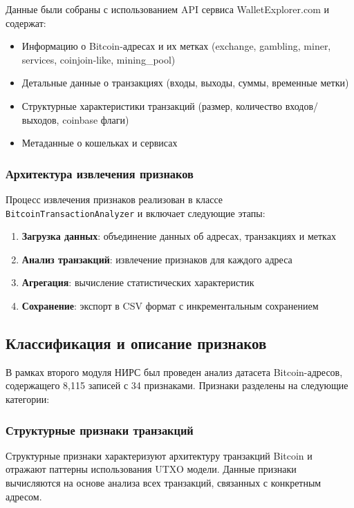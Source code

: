 Данные были собраны с использованием API сервиса WalletExplorer.com и содержат:
\begin{itemize}
    \item Информацию о Bitcoin-адресах и их метках (exchange, gambling, miner, services, coinjoin-like, mining\_pool)
    \item Детальные данные о транзакциях (входы, выходы, суммы, временные метки)
    \item Структурные характеристики транзакций (размер, количество входов/выходов, coinbase флаги)
    \item Метаданные о кошельках и сервисах
\end{itemize}

\subsubsection{Архитектура извлечения признаков}

Процесс извлечения признаков реализован в классе \texttt{BitcoinTransactionAnalyzer} и включает следующие этапы:

\begin{enumerate}
    \item \textbf{Загрузка данных}: объединение данных об адресах, транзакциях и метках
    \item \textbf{Анализ транзакций}: извлечение признаков для каждого адреса
    \item \textbf{Агрегация}: вычисление статистических характеристик
    \item \textbf{Сохранение}: экспорт в CSV формат с инкрементальным сохранением
\end{enumerate}

\subsection{Классификация и описание признаков}

В рамках второго модуля НИРС был проведен анализ датасета Bitcoin-адресов, содержащего 8,115 записей с 34 признаками. Признаки разделены на следующие категории:

\subsubsection{Структурные признаки транзакций}

Структурные признаки характеризуют архитектуру транзакций Bitcoin и отражают паттерны использования UTXO модели. Данные признаки вычисляются на основе анализа всех транзакций, связанных с конкретным адресом.


